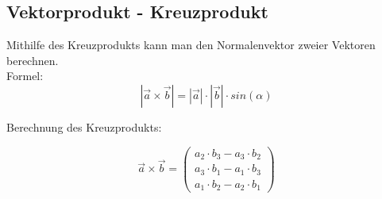 \subsection{Vektorprodukt - Kreuzprodukt}
\label{sec:kreuzprodukt}
Mithilfe des Kreuzprodukts kann man den Normalenvektor zweier Vektoren berechnen. \\
Formel: 
\[ |\vec{a} \times \vec{b}| = |\vec{a}| \cdot |\vec{b}| \cdot sin(\alpha) \]

Berechnung des Kreuzprodukts: 

\[
\vec{a} \times \vec{b} = 
\begin{pmatrix}
    a_2 \cdot b_3 - a_3 \cdot b_2 \\
    a_3 \cdot b_1 - a_1 \cdot b_3 \\
    a_1 \cdot b_2 - a_2 \cdot b_1
\end{pmatrix}
\]
